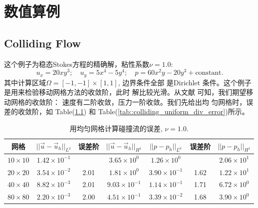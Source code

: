 \documentclass{report}
\theoremstyle{Remark}
\begin{document}
    \chapter{数值算例}
       \section{Colliding Flow}    
          这个例子为稳态Stokes方程的精确解，粘性系数$\nu = 1.0$:
          \begin{equation}
            u_x = 20 x y^3; \quad u_y = 5 x^4 - 5 y^4; \quad p = 60 x^2 y - 20
            y^3 + \mbox{constant}.
            \label{eq::colliding}
          \end{equation}
          其中计算区域$\Omega = [-1, -1] \times [1, 1]$, 边界条件全部
          是Dirichlet 条件。这个例子是用来检验移动网格方法的收敛阶，此时
          解比较光滑。从文献\cite{bercovier1979error} 可知，我们期望移
          动网格的收敛阶： 速度有二阶收敛，压力一阶收敛。我们先给出均
          匀网格时，误差的收敛阶，如
          Table(\ref{tab::colliding_uniform_error}) 和
          Table(\ref{tab::colliding_uniform_div_error})所示。

          \begin{table}[!htbp]
            \centering
            \begin{tabular}{ccccccc} \toprule
              网格   & $||\vec{u} - \vec{u}_h ||_{L^2}$ & 误差阶 &$||\vec{u} -
              \vec{u}_h ||_{H^1}$ & $||p - p_h||_{L^0}$ & 误差阶 &$||p -
              p_h||_{H^1}$  \\ \midrule
              $10 \times 10$   &   $1.42 \times 10^{-1}$   &  &  $3.65 \times
              10^0$     &   $1.26 \times 10^0$ & & $2.06 \times 10^1$    \\  
              $20 \times 20 $   &   $3.54 \times 10^{-2}$   & 2.01  &  $1.81 \times
              10^0$     &   $3.90 \times 10^{-1}$ & 1.62 & $1.22 \times 10^1$   \\
              $40 \times 40 $   &   $8.82 \times 10^{-3}$   & 2.01  & $9.03 \times
              10^{-1}$  &   $1.14 \times 10^{-1}$ & 1.71 & $6.72 \times 10^0$   \\
              $80 \times 80 $   &   $2.20 \times 10^{-3}$   & 2.00  & $4.51 \times
              10^{-1}$  &   $3.39 \times 10^{-2}$ &  1.68 & $3.90 \times 10^0$  \\ \bottomrule
            \end{tabular}
            \caption{\small 用均匀网格计算碰撞流的误差, $\nu = 1.0$.}
            \label{tab::colliding_uniform_error}
          \end{table}
          
\end{document}

